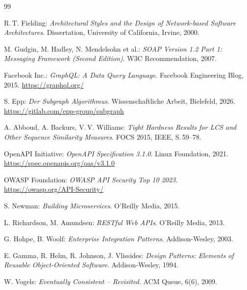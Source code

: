 ﻿\documentclass[a4paper,12pt]{article}
\theoremstyle{definition}
\begin{document}
\begin{thebibliography}{99}

  R.\,T. Fielding:
  \textit{Architectural Styles and the Design of Network-based Software Architectures}.
  Dissertation, University of California, Irvine, 2000.

  M. Gudgin, M. Hadley, N. Mendelsohn et al.:
  \textit{SOAP Version 1.2 Part 1: Messaging Framework (Second Edition)}.
  W3C Recommendation, 2007.

  Facebook Inc.:
  \textit{GraphQL: A Data Query Language}.
  Facebook Engineering Blog, 2015.
  \url{https://graphql.org/}

  S. Epp:
  \textit{Der Subgraph Algorithmus}.
  Wissenschaftliche Arbeit, Bielefeld, 2026.
  \url{https://gitlab.com/epp-group/subgraph}

  A. Abboud, A. Backurs, V.\,V. Williams:
  \textit{Tight Hardness Results for LCS and Other Sequence Similarity Measures}.
  FOCS 2015, IEEE, S.\,59--78.

  OpenAPI Initiative:
  \textit{OpenAPI Specification 3.1.0}.
  Linux Foundation, 2021.
  \url{https://spec.openapis.org/oas/v3.1.0}

  OWASP Foundation:
  \textit{OWASP API Security Top 10 2023}.
  \url{https://owasp.org/API-Security/}

  S. Newman:
  \textit{Building Microservices}.
  O'Reilly Media, 2015.

  L. Richardson, M. Amundsen:
  \textit{RESTful Web APIs}.
  O'Reilly Media, 2013.

  G. Hohpe, B. Woolf:
  \textit{Enterprise Integration Patterns}.
  Addison-Wesley, 2003.

  E. Gamma, R. Helm, R. Johnson, J. Vlissides:
  \textit{Design Patterns: Elements of Reusable Object-Oriented Software}.
  Addison-Wesley, 1994.

  W. Vogels:
  \textit{Eventually Consistent -- Revisited}.
  ACM Queue, 6(6), 2009.

\end{thebibliography}
\end{document}
